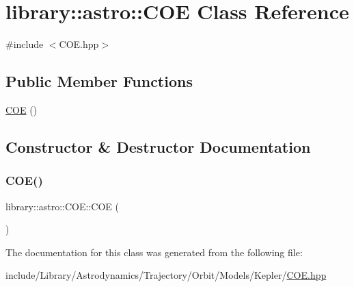 \hypertarget{classlibrary_1_1astro_1_1_c_o_e}{}\section{library\+:\+:astro\+:\+:C\+OE Class Reference}
\label{classlibrary_1_1astro_1_1_c_o_e}


{\ttfamily \#include $<$C\+O\+E.\+hpp$>$}

\subsection*{Public Member Functions}
\begin{DoxyCompactItemize}
\item 
\hyperlink{classlibrary_1_1astro_1_1_c_o_e_aed7ec4fe705a4145cac5f66d12b4343b}{C\+OE} ()
\end{DoxyCompactItemize}


\subsection{Constructor \& Destructor Documentation}
\mbox{\label{classlibrary_1_1astro_1_1_c_o_e_aed7ec4fe705a4145cac5f66d12b4343b}} 
\subsubsection{\texorpdfstring{C\+O\+E()}{COE()}}
{\footnotesize\ttfamily library\+::astro\+::\+C\+O\+E\+::\+C\+OE (\begin{DoxyParamCaption}{ }\end{DoxyParamCaption})}



The documentation for this class was generated from the following file\+:\begin{DoxyCompactItemize}
\item 
include/\+Library/\+Astrodynamics/\+Trajectory/\+Orbit/\+Models/\+Kepler/\hyperlink{_c_o_e_8hpp}{C\+O\+E.\+hpp}\end{DoxyCompactItemize}
